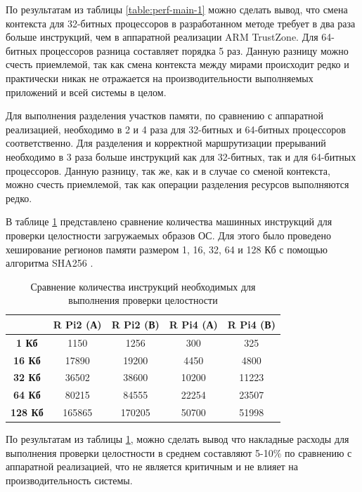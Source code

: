 По результатам из таблицы \ref{table:perf-main-1} можно сделать вывод, что смена контекста для 32-битных процессоров в разработанном методе требует в два раза больше инструкций, чем в аппаратной реализации ARM TrustZone. Для 64-битных процессоров разница составляет порядка 5 раз. Данную разницу можно счесть приемлемой, так как смена контекста между мирами происходит редко и практически никак не отражается на производительности выполняемых приложений и всей системы в целом.

Для выполнения разделения участков памяти, по сравнению с аппаратной реализацией, необходимо в 2 и 4 раза для 32-битных и 64-битных процессоров соответственно. Для разделения и корректной маршрутизации прерываний необходимо в 3 раза больше инструкций как для 32-битных, так и для 64-битных процессоров. Данную разницу, так же, как и в случае со сменой контекста, можно счесть приемлемой, так как операции разделения ресурсов выполняются редко.

В таблице \ref{table:perf-main-2} представлено сравнение количества машинных инструкций для проверки целостности загружаемых образов ОС. Для этого было проведено хеширование регионов памяти размером 1, 16, 32, 64 и 128 Кб с помощью алгоритма SHA256 \cite{sha-256}.

\begin{table}[!htb]
	\begin{center}
		\caption{Сравнение количества инструкций необходимых для выполнения проверки целостности}
		\label{table:perf-main-2}
		\begin{tabular}{|c|c|c|c|c|}
			\hline
			& \bfseries R Pi2 (А) & \bfseries R Pi2 (В) & \bfseries R Pi4 (А) & \bfseries R Pi4 (В)\\
			\hline
			\bfseries 1 Кб & 1150 & 1256 & 300 & 325 \\ \hline
			\bfseries 16 Кб & 17890 & 19200 & 4450 & 4800 \\ \hline
			\bfseries 32 Кб  & 36502 & 38600 & 10200 & 11223 \\ \hline	
			\bfseries 64 Кб  & 80215 & 84555 & 22254 & 23507 \\ \hline	
			\bfseries 128 Кб  & 165865 & 170205 & 50700 & 51998 \\ \hline	
		\end{tabular}
	\end{center}
\end{table}

По результатам из таблицы \ref{table:perf-main-2}, можно сделать вывод что накладные расходы для выполнения проверки целостности в среднем составляют 5-10\% по сравнению с аппаратной реализацией, что не является критичным и не влияет на производительность системы.

